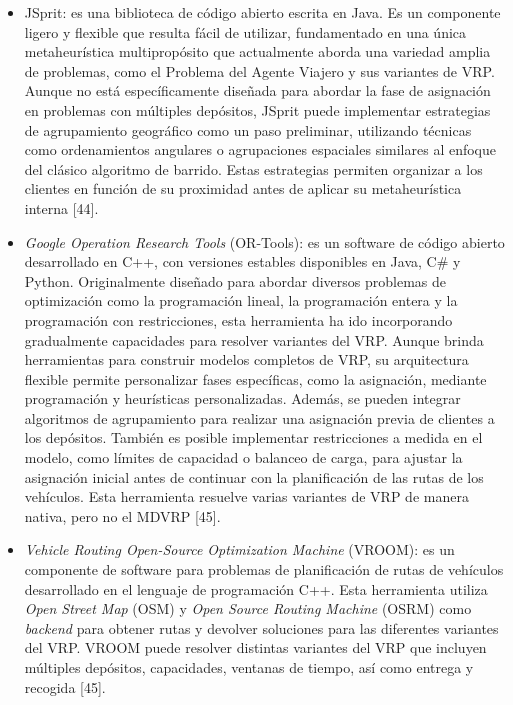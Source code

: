\begin{itemize}
  \item JSprit: es una biblioteca de c\'odigo abierto escrita en Java. Es un componente ligero y flexible que resulta f\'acil de utilizar, fundamentado en una \'unica metaheur\'istica multiprop\'osito que actualmente aborda una variedad amplia de problemas, como el Problema del Agente Viajero y sus variantes de VRP. Aunque no est\'a espec\'ificamente dise\~nada para abordar la fase de asignaci\'on en problemas con m\'ultiples dep\'ositos, JSprit puede implementar estrategias de agrupamiento geogr\'afico como un paso preliminar, utilizando t\'ecnicas como ordenamientos angulares o agrupaciones espaciales similares al enfoque del cl\'asico algoritmo de barrido. Estas estrategias permiten organizar a los clientes en funci\'on de su proximidad antes de aplicar su metaheur\'istica interna [44].
  \item \textit{Google Operation Research Tools} (OR-Tools): es un software de c\'odigo abierto desarrollado en C++, con versiones estables disponibles en Java, C\# y Python. Originalmente dise\~nado para abordar diversos problemas de optimizaci\'on como la programaci\'on lineal, la programaci\'on entera y la programaci\'on con restricciones, esta herramienta ha ido incorporando gradualmente capacidades para resolver variantes del VRP. Aunque brinda herramientas para construir modelos completos de VRP, su arquitectura flexible permite personalizar fases espec\'ificas, como la asignaci\'on, mediante programaci\'on y heur\'isticas personalizadas. Adem\'as, se pueden integrar algoritmos de agrupamiento para realizar una asignaci\'on previa de clientes a los dep\'ositos. Tambi\'en es posible implementar restricciones a medida en el modelo, como l\'imites de capacidad o balanceo de carga, para ajustar la asignaci\'on inicial antes de continuar con la planificaci\'on de las rutas de los veh\'iculos. Esta herramienta resuelve varias variantes de VRP de manera nativa, pero no el MDVRP [45].
  \item \textit{Vehicle Routing Open-Source Optimization Machine} (VROOM): es un componente de software para problemas de planificaci\'on de rutas de veh\'iculos desarrollado en el lenguaje de programaci\'on C++. Esta herramienta utiliza \textit{Open Street Map} (OSM) y \textit{Open Source Routing Machine} (OSRM) como \textit{backend} para obtener rutas y devolver soluciones para las diferentes variantes del VRP. VROOM puede resolver distintas variantes del VRP que incluyen m\'ultiples dep\'ositos, capacidades, ventanas de tiempo, as\'i como entrega y recogida [45].

\end{itemize}
